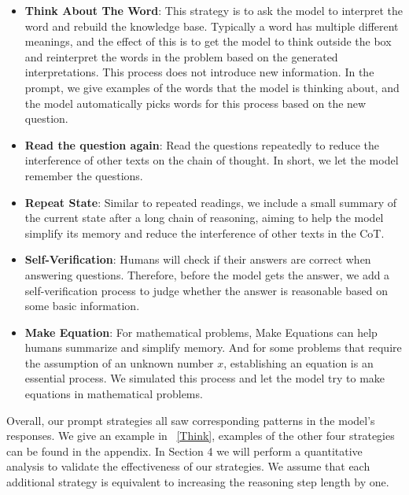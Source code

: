 \begin{itemize}[leftmargin=*]\setlength\itemsep{-0.3em}
\item
\textbf{Think About The Word}: This strategy is to ask the model to interpret the word and rebuild the knowledge base. Typically a word has multiple different meanings, and the effect of this is to get the model to think outside the box and reinterpret the words in the problem based on the generated interpretations. This process does not introduce new information. In the prompt, we give examples of the words that the model is thinking about, and the model automatically picks words for this process based on the new question.

\item
\textbf{Read the question again}: Read the questions repeatedly to reduce the interference of other texts on the chain of thought. In short, we let the model remember the questions.

\item
\textbf{Repeat State}: Similar to repeated readings, we include a small summary of the current state after a long chain of reasoning, aiming to help the model simplify its memory and reduce the interference of other texts in the CoT.

\item
\textbf{Self-Verification}: Humans will check if their answers are correct when answering questions. Therefore, before the model gets the answer, we add a self-verification process to judge whether the answer is reasonable based on some basic information.

\item
\textbf{Make Equation}: For mathematical problems, Make Equations can help humans summarize and simplify memory. And for some problems that require the assumption of an unknown number $x$, establishing an equation is an essential process. We simulated this process and let the model try to make equations in mathematical problems.
\end{itemize}

Overall, our prompt strategies all saw corresponding patterns in the model's responses. We give an example in ~\autoref{Think}, examples of the other four strategies can be found in the appendix. In Section 4 we will perform a quantitative analysis to validate the effectiveness of our strategies. We assume that each additional strategy is equivalent to increasing the reasoning step length by one.